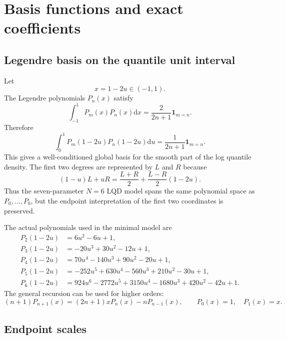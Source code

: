 \documentclass[11pt]{article}
\newcommand{\dd}{\mathrm{d}}
\newcommand{\1}{\mathbf{1}}
\begin{document}
\section{Basis functions and exact coefficients}

\subsection{Legendre basis on the quantile unit interval}

Let
\begin{equation}
    x=1-2u\in(-1,1).
\end{equation}
The Legendre polynomials $P_n(x)$ satisfy
\begin{equation}
    \int_{-1}^{1}P_m(x)P_n(x)\dd x=\frac{2}{2n+1}\1_{m=n}.
\end{equation}
Therefore
\begin{equation}
    \int_0^1P_m(1-2u)P_n(1-2u)\dd u=\frac{1}{2n+1}\1_{m=n}. \label{eq:leg_orth}
\end{equation}
This gives a well-conditioned global basis for the smooth part of the log quantile density.  The first two degrees are represented by $L$ and $R$ because
\begin{equation}
    (1-u)L+uR=\frac{L+R}{2}+\frac{L-R}{2}(1-2u). \label{eq:LR_P0P1}
\end{equation}
Thus the seven-parameter $N=6$ LQD model spans the same polynomial space as $P_0,\ldots,P_6$, but the endpoint interpretation of the first two coordinates is preserved.

The actual polynomials used in the minimal model are
\begin{align}
P_2(1-2u)&=6u^2-6u+1,\label{eq:P2}\\
P_3(1-2u)&=-20u^3+30u^2-12u+1,\label{eq:P3}\\
P_4(1-2u)&=70u^4-140u^3+90u^2-20u+1,\label{eq:P4}\\
P_5(1-2u)&=-252u^5+630u^4-560u^3+210u^2-30u+1,\label{eq:P5}\\
P_6(1-2u)&=924u^6-2772u^5+3150u^4-1680u^3+420u^2-42u+1.\label{eq:P6}
\end{align}
The general recursion can be used for higher orders:
\begin{equation}
    (n+1)P_{n+1}(x)=(2n+1)xP_n(x)-nP_{n-1}(x),
    \qquad P_0(x)=1,
    \quad P_1(x)=x. \label{eq:leg_recursion}
\end{equation}

\subsection{Endpoint scales}
\end{document}
